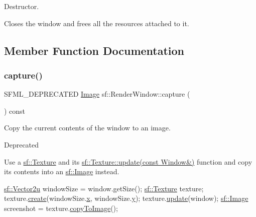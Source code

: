 Destructor. 

Closes the window and frees all the resources attached to it. 

\subsection{Member Function Documentation}
\mbox{\label{classsf_1_1_render_window_a370137abe81f6b7d62b600ceeccd54d3}} 
\subsubsection{\texorpdfstring{capture()}{capture()}}
{\footnotesize\ttfamily S\+F\+M\+L\+\_\+\+D\+E\+P\+R\+E\+C\+A\+T\+ED \hyperlink{classsf_1_1_image}{Image} sf\+::\+Render\+Window\+::capture (\begin{DoxyParamCaption}{ }\end{DoxyParamCaption}) const}



Copy the current contents of the window to an image. 

\begin{DoxyRefDesc}{Deprecated}
\item[\hyperlink{deprecated__deprecated000006}{Deprecated}]Use a \hyperlink{classsf_1_1_texture}{sf\+::\+Texture} and its \hyperlink{classsf_1_1_texture_ad3cceef238f7d5d2108a98dd38c17fc5}{sf\+::\+Texture\+::update(const Window\&)} function and copy its contents into an \hyperlink{classsf_1_1_image}{sf\+::\+Image} instead. \end{DoxyRefDesc}

\begin{DoxyCode}
\hyperlink{classsf_1_1_vector2}{sf::Vector2u} windowSize = window.getSize();
\hyperlink{classsf_1_1_texture}{sf::Texture} texture;
texture.\hyperlink{classsf_1_1_texture_a89b4c7d204acf1033c3a1b6e0a3ad0a3}{create}(windowSize.\hyperlink{classsf_1_1_vector2_a1e6ad77fa155f3753bfb92699bd28141}{x}, windowSize.\hyperlink{classsf_1_1_vector2_a420f2481b015f4eb929c75f2af564299}{y});
texture.\hyperlink{classsf_1_1_texture_ae4eab5c6781316840b0c50ad08370963}{update}(window);
\hyperlink{classsf_1_1_image}{sf::Image} screenshot = texture.\hyperlink{classsf_1_1_texture_a77e18a70de2e525ac5e4a7cd95f614b9}{copyToImage}();
\end{DoxyCode}


